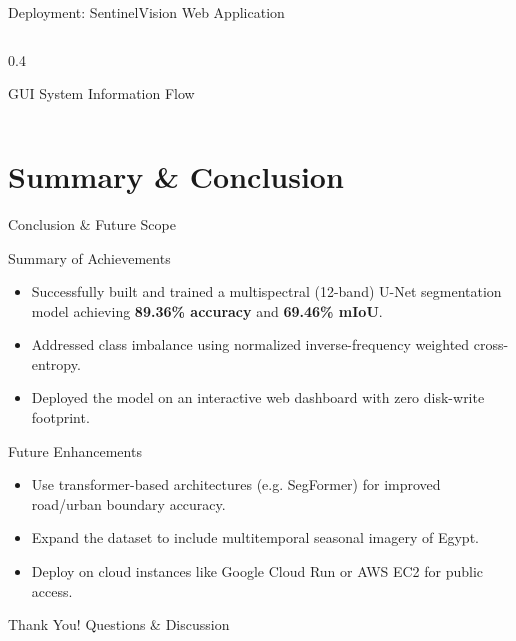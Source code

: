 \documentclass[aspectratio=169]{beamer}
\begin{document}
\begin{frame}{Deployment: SentinelVision Web Application}
\begin{columns}
\begin{column}{0.4\textwidth}
            \vskip0.2cm
            \footnotesize GUI System Information Flow
        \end{column}
    \end{columns}
\end{frame}

\section{Summary \& Conclusion}
\begin{frame}{Conclusion \& Future Scope}
    \begin{block}{Summary of Achievements}
        \begin{itemize}
            \item Successfully built and trained a multispectral (12-band) U-Net segmentation model achieving \textbf{89.36\% accuracy} and \textbf{69.46\% mIoU}.
            \item Addressed class imbalance using normalized inverse-frequency weighted cross-entropy.
            \item Deployed the model on an interactive web dashboard with zero disk-write footprint.
        \end{itemize}
    \end{block}
    \begin{block}{Future Enhancements}
        \begin{itemize}
            \item Use transformer-based architectures (e.g. SegFormer) for improved road/urban boundary accuracy.
            \item Expand the dataset to include multitemporal seasonal imagery of Egypt.
            \item Deploy on cloud instances like Google Cloud Run or AWS EC2 for public access.
        \end{itemize}
    \end{block}
\end{frame}

\begin{frame}
    \centering
    \Huge \color{navyblue} Thank You!
    \vskip1cm
    \Large Questions \& Discussion
\end{frame}
\end{document}
